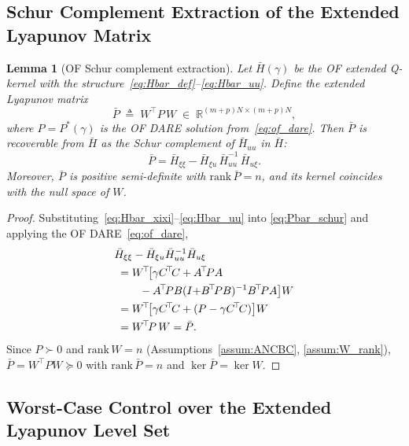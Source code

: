 \documentclass[final,5p,times,authoryear]{elsarticle}
\theoremstyle{plain}
\newtheorem{lemma}{Lemma}
\theoremstyle{definition}
\theoremstyle{remark}
\begin{document}
\subsection{Schur Complement Extraction of the Extended Lyapunov Matrix}
\label{sec:of_schur}

\begin{lemma}[OF Schur complement extraction]\label{lemma:Pbar}
Let $\bar H(\gamma)$ be the OF extended Q-kernel with the
structure~\eqref{eq:Hbar_def}--\eqref{eq:Hbar_uu}.  Define the
extended Lyapunov matrix
\begin{equation}
\bar P \;\triangleq\; W^{\!\top}\!P\,W
   \;\in\; \mathbb{R}^{(m+p)N \times (m+p)N},
\label{eq:Pbar_def}
\end{equation}
where $P = P^{*}(\gamma)$ is the OF DARE solution
from~\eqref{eq:of_dare}.  Then $\bar P$ is recoverable from $\bar H$
as the Schur complement of $\bar H_{uu}$ in $\bar H$:
\begin{equation}
\bar P
   = \bar H_{\xi\xi}
     - \bar H_{\xi u}\,\bar H_{uu}^{-1}\,\bar H_{u\xi}.
\label{eq:Pbar_schur}
\end{equation}
Moreover, $\bar P$ is positive semi-definite with
$\mathrm{rank}\,\bar P = n$, and its kernel coincides with the null
space of $W$.
\end{lemma}

\begin{proof}
Substituting~\eqref{eq:Hbar_xixi}--\eqref{eq:Hbar_uu} into
\eqref{eq:Pbar_schur} and applying the OF DARE~\eqref{eq:of_dare},
\begin{align}
&\bar H_{\xi\xi} - \bar H_{\xi u}\bar H_{uu}^{-1}\bar H_{u\xi} \notag\\
&\; = W^{\!\top}\!\bigl[\gamma C^{\!\top}\!C + A^{\!\top}\!PA \notag\\
&\qquad\; - A^{\!\top}\!PB(I{+}B^{\!\top}\!PB)^{-1}B^{\!\top}\!PA\bigr]W \notag\\
&\; = W^{\!\top}\!\bigl[\gamma C^{\!\top}\!C + (P - \gamma C^{\!\top}\!C)\bigr]W \notag\\
&\; = W^{\!\top}\!P\,W = \bar P.
\end{align}
Since $P \succ 0$ and $\mathrm{rank}\,W = n$
(Assumptions~\ref{assum:ANCBC}, \ref{assum:W_rank}),
$\bar P = W^{\!\top}\!PW \succeq 0$ with $\mathrm{rank}\,\bar P = n$ and
$\ker\bar P = \ker W$.
\end{proof}

\subsection{Worst-Case Control over the Extended Lyapunov Level Set}
\label{sec:of_umax}
\end{document}
